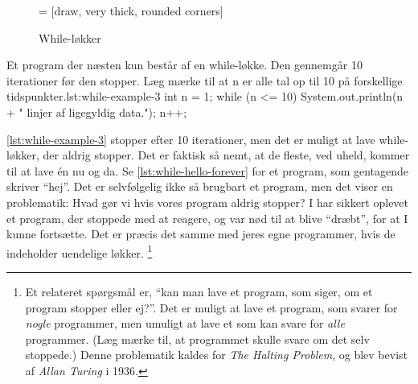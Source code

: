 
        \begin{figure}
        \center
         = [draw, very thick, rounded corners]
        \caption{While-løkker}
        \label{fig:while-loop-illustrated}
        \end{figure}

		\begin{JavaCode}{Et program der næsten kun består af en while-løkke. Den gennemgår 10 iterationer før den stopper. Læg mærke til at n er alle tal op til 10 på forskellige tidspunkter.}{lst:while-example-3}
			int n = 1;
			while (n <= 10) {
				System.out.println(n + " linjer af ligegyldig data.");
				n++;
			}
		\end{JavaCode}

        \autoref{lst:while-example-3} stopper efter 10
        iterationer, men det er muligt at lave while-løkker, der aldrig
        stopper.  Det er faktisk så nemt, at de fleste, ved uheld,
        kommer til at lave én nu og da. Se
        \autoref{lst:while-hello-forever} for et program, som
        gentagende skriver ``hej''. Det er selvfølgelig ikke så
        brugbart et program, men det viser en problematik: Hvad gør vi
        hvis vores program aldrig stopper? I har sikkert oplevet et
        program, der stoppede med at reagere, og var nød til at blive
        ``dræbt'', for at I kunne fortsætte. Det er præcis det samme
        med jeres egne programmer, hvis de indeholder uendelige
        løkker. \footnote{Et relateret spørgsmål er, ``kan man lave et
        program, som siger, om et program stopper eller ej?''. Det er
        muligt at lave et program, som svarer for \emph{nogle}
        programmer, men umuligt at lave et som kan svare for
        \emph{alle} programmer.  (Læg mærke til, at programmet skulle
        svare om det selv stoppede.) Denne problematik kaldes for
        \emph{The Halting Problem}, og blev bevist af \emph{Allan
        Turing} i 1936.}

